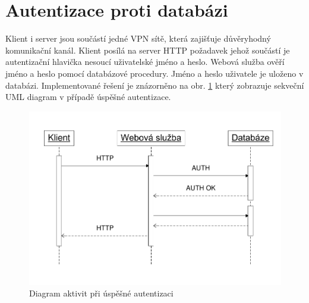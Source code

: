 \documentclass{diplomka}
\begin{document}
\section{Autentizace proti databázi}
Klient i server jsou součástí jedné VPN sítě, která zajišťuje důvěryhodný komunikační kanál.  Klient posílá na server HTTP požadavek jehož součástí je autentizační hlavička nesoucí uživatelské jméno a heslo. Webová služba ověří jméno a heslo pomocí databázové procedury. Jméno a heslo uživatele je uloženo v databázi. Implementované řešení je znázorněno na obr. \ref{obr:auth} který zobrazuje sekveční UML diagram v případě úspěšné autentizace.
\begin{figure}[H]
  \centering
  \includegraphics[scale=0.8]{visio/auth.pdf}
\caption{Diagram aktivit při úspěšné autentizaci}
\label{obr:auth}
\end{figure}
\end{document}
